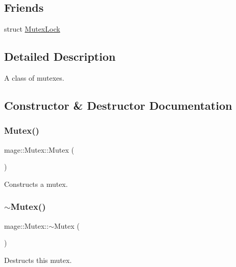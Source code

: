 \subsection*{Friends}
\begin{DoxyCompactItemize}
\item 
struct \hyperlink{classmage_1_1_mutex_a058473d070063e5098732f355f432bd9}{Mutex\+Lock}
\end{DoxyCompactItemize}


\subsection{Detailed Description}
A class of mutexes. 

\subsection{Constructor \& Destructor Documentation}
\hypertarget{classmage_1_1_mutex_ab22db01311271ef54642b10ea53dfd8a}{}\label{classmage_1_1_mutex_ab22db01311271ef54642b10ea53dfd8a} 
\subsubsection{\texorpdfstring{Mutex()}{Mutex()}\hspace{0.1cm}{\footnotesize\ttfamily [1/3]}}
{\footnotesize\ttfamily mage\+::\+Mutex\+::\+Mutex (\begin{DoxyParamCaption}{ }\end{DoxyParamCaption})}

Constructs a mutex. \hypertarget{classmage_1_1_mutex_a143d82ec7bb43f953a1703caa7972e9d}{}\label{classmage_1_1_mutex_a143d82ec7bb43f953a1703caa7972e9d} 
\subsubsection{\texorpdfstring{$\sim$\+Mutex()}{~Mutex()}}
{\footnotesize\ttfamily mage\+::\+Mutex\+::$\sim$\+Mutex (\begin{DoxyParamCaption}{ }\end{DoxyParamCaption})}

Destructs this mutex. \hypertarget{classmage_1_1_mutex_af1c2c7d0134ba853903522d2f3684f22}{}\label{classmage_1_1_mutex_af1c2c7d0134ba853903522d2f3684f22} 
